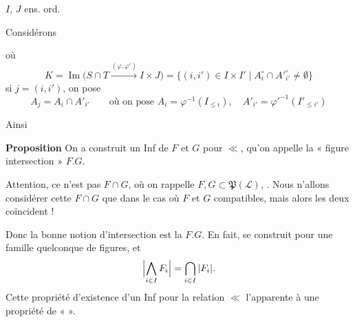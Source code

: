 \documentclass[11pt,a4paper]{article}
\begin{document}

 $I$, $J$ ens. ord.

Considérons


où
\[
  K = \operatorname{Im}\bigl(S \cap T \xrightarrow{(\varphi,\varphi')} I \times J\bigr) = \{(i,i') \in I \times I' \mid A_{i}^{\circ} \cap A'^{\circ}_{i'} \neq \emptyset\}
\]
si $j = (i,i')$, on pose
\[
  \boxed{A_{j} = A_{i} \cap A'_{i'}} \qquad \text{où on pose } A_{i} = \varphi^{-1}(I_{\leq i}), \quad A'_{i'} = \varphi'^{-1}(I'_{\leq i'})
\]

 Ainsi

\textbf{Proposition} On a construit un Inf de $F$ et $G$ pour $\ll$, qu'on appelle la « figure intersection » $F.G$.

Attention, ce n'est pas   $F \cap G$, \struck{\ill{}} où on rappelle $F, G \subset \mathfrak{P}(\mathcal{L})$, . Nous n'allons considérer cette $F \cap G$ que dans le cas où $F$ et $G$ compatibles, mais alors les deux coïncident !

Donc la bonne notion d'intersection est la $F.G$. En fait, se construit pour une famille quelconque de figures, et
\[
  \Bigl|\bigwedge_{i \in I} F_{i}\Bigr| = \bigcap_{i \in I} |F_{i}| .
\]
Cette propriété d'existence d'un Inf pour la relation $\ll$ l'apparente à une propriété de \struck{\ill{}} «  ».
\end{document}
